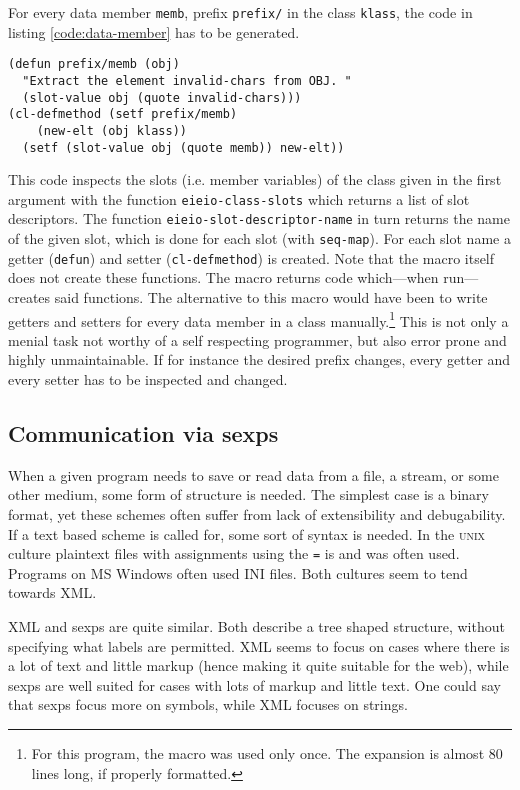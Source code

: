 \documentclass[a4paper,10pt,twoside]{article}
\newcommand{\sym}[1]{\texttt{#1}}
\newcommand{\fun}[1]{\texttt{#1}}
\newcommand{\unix}{\textsc{unix}}
\newcommand{\windows}{MS Windows\texttrademark}
\begin{document}
For every data member \sym{memb}, prefix \sym{prefix/} in the class
\sym{klass}, the code in listing \ref{code:data-member} has to be generated.

\begin{lstlisting}[style=lispcode,caption={Getter and Setter for a member called
  \sym{member}.},label={code:data-member}]
(defun prefix/memb (obj)
  "Extract the element invalid-chars from OBJ. "
  (slot-value obj (quote invalid-chars)))
(cl-defmethod (setf prefix/memb)
    (new-elt (obj klass))
  (setf (slot-value obj (quote memb)) new-elt))
\end{lstlisting}

This code inspects the slots (i.e. member variables) of the class given in the
first argument with the function \fun{eieio-class-slots} which returns a list of
slot descriptors.  The function \fun{eieio-slot-descriptor-name} in turn returns
the name of the given slot, which is done for each slot (with \fun{seq-map}).
For each slot name a getter (\fun{defun}) and setter (\fun{cl-defmethod}) is
created.  Note that the macro itself does not create these functions.  The macro
returns code which---when run---creates said functions.  The alternative to this
macro would have been to write getters and setters for every data member in a
class manually.\footnote{For this program, the macro was used only once.  The
  expansion is almost 80 lines long, if properly formatted.}  This is not only a
menial task not worthy of a self respecting programmer, but also error prone and
highly unmaintainable.  If for instance the desired prefix changes, every getter
and every setter has to be inspected and changed.

\subsection{Communication via sexps}
\label{subsec:sexp-communication}

When a given program needs to save or read data from a file, a stream, or some
other medium, some form of structure is needed.  The simplest case is a binary
format, yet these schemes often suffer from lack of extensibility and
debugability.  If a text based scheme is called for, some sort of syntax is
needed.  In the \unix{} culture plaintext files with assignments using the
\texttt{=} is and was often used.  Programs on \windows{} often used INI files.
Both cultures seem to tend towards XML.  

XML and sexps are quite similar.  Both describe a tree shaped structure, without
specifying what labels are permitted.  XML seems to focus on cases where there
is a lot of text and little markup (hence making it quite suitable for the web),
while sexps are well suited for cases with lots of markup and little text.  One
could say that sexps focus more on symbols, while XML focuses on strings.
\end{document}
